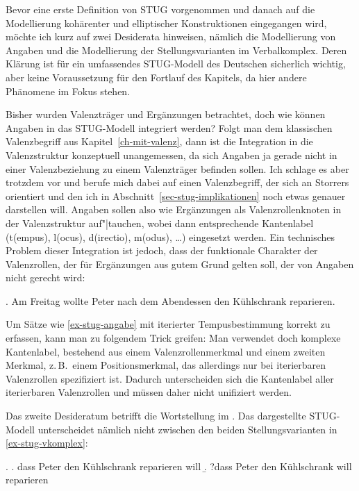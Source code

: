 Bevor eine erste Definition von STUG vorgenommen und danach auf die Modellierung kohärenter und elliptischer Konstruktionen eingegangen wird, möchte ich kurz auf zwei Desiderata hinweisen, nämlich die Modellierung von Angaben und die Modellierung der Stellungsvarianten im Verbalkomplex. Deren Klärung ist für ein umfassendes STUG-Modell des Deutschen sicherlich wichtig, aber keine Voraussetzung für den Fortlauf des Kapitels, da hier andere Phänomene im Fokus stehen.

Bisher wurden Valenzträger und Ergänzungen betrachtet, doch wie können Angaben in das STUG-Modell integriert werden? Folgt man dem klassischen Valenzbegriff aus Kapitel~\ref{ch-mit-valenz}, dann ist die Integration in die Valenzstruktur konzeptuell unangemessen, da sich Angaben ja gerade nicht in einer Valenzbeziehung zu einem Valenzträger befinden sollen. Ich schlage es aber trotzdem vor und berufe mich dabei auf einen Valenzbegriff, der sich an Storrers  orientiert und den ich in Abschnitt~\ref{sec-stug-implikationen} noch etwas genauer darstellen will. Angaben sollen also wie Ergänzungen als Valenzrollenknoten in der Valenzstruktur auf"|tauchen, wobei dann entsprechende Kantenlabel ({\sc t(empus)}, {\sc l(ocus)}, {\sc d(irectio)}, {\sc m(odus)}, \ldots) eingesetzt werden. Ein technisches Problem dieser Integration ist jedoch, dass der funktionale Charakter der Valenzrollen, der für Ergänzungen aus gutem Grund gelten soll, der  von Angaben nicht gerecht wird:

\ex. \label{ex-stug-angabe} Am Freitag wollte Peter nach dem Abendessen den Kühlschrank reparieren.

Um Sätze wie \ref{ex-stug-angabe} mit iterierter Tempusbestimmung korrekt zu erfassen, kann man zu folgendem Trick greifen: Man verwendet doch komplexe Kantenlabel, bestehend aus einem Valenzrollenmerkmal und einem zweiten  Merkmal, z.\,B.\ einem Positionsmerkmal, das allerdings nur bei iterierbaren Valenzrollen spezifiziert ist. Dadurch unterscheiden sich die Kantenlabel aller iterierbaren Valenzrollen und müssen daher nicht unifiziert werden.      

Das zweite Desideratum betrifft die Wortstellung im . Das dargestellte STUG-Modell unterscheidet nämlich nicht zwischen den beiden Stellungsvarianten in \ref{ex-stug-vkomplex}:

\ex. \label{ex-stug-vkomplex}
\a. dass Peter den Kühlschrank reparieren will 
\b. ?dass Peter den Kühlschrank will reparieren\label{ex-stug-vkomplex-b} 

